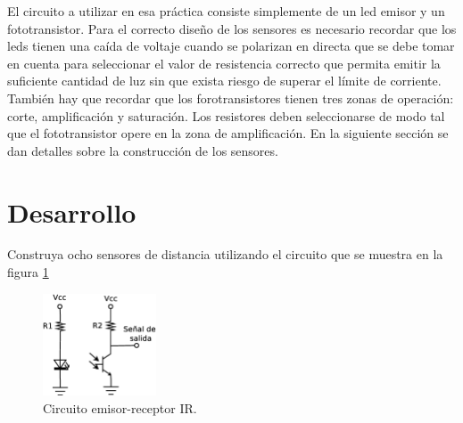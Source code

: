 \documentclass[a4paper,12pt]{article}
\begin{document}
El circuito a utilizar en esa práctica consiste simplemente de un led emisor y un fototransistor. Para el correcto diseño de los sensores es necesario recordar que los leds tienen una caída de voltaje cuando se polarizan en directa que se debe tomar en cuenta para seleccionar el valor de resistencia correcto que permita emitir la suficiente cantidad de luz sin que exista riesgo de superar el límite de corriente. También hay que recordar que los forotransistores tienen tres zonas de operación: corte, amplificación y saturación. Los resistores deben seleccionarse de modo tal que el fototransistor opere en la zona de amplificación. En la siguiente sección se dan detalles sobre la construcción de los sensores. 

\section{Desarrollo}
Construya ocho sensores de distancia utilizando el circuito que se muestra en la figura \ref{fig:CircuitoIR}

\begin{figure}
  \centering
  \includegraphics[width=0.3\textwidth]{Figures/Infrarrojo.eps}
  \caption{Circuito emisor-receptor IR.}
  \label{fig:CircuitoIR}
\end{figure}
\end{document}
